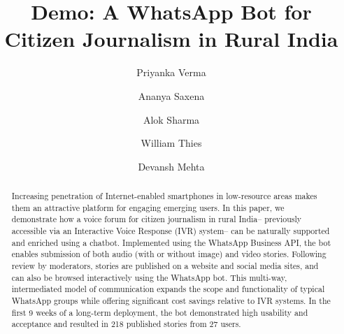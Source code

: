 \documentclass[manuscript]{acmart}
\begin{document}
\title{Demo: A WhatsApp Bot for Citizen Journalism in Rural India}



\author{Priyanka Verma}

\author{Ananya Saxena}
\author{Alok Sharma}
\author{William Thies}
\author{Devansh Mehta}



%

%
\begin{abstract}
Increasing penetration of Internet-enabled smartphones in low-resource areas makes them an attractive platform for engaging emerging users. In this paper, we demonstrate how a voice forum for citizen journalism in rural India-- previously accessible via an Interactive Voice Response (IVR) system-- can be naturally supported and enriched using a chatbot. Implemented using the WhatsApp Business API, the bot enables submission of both audio (with or without image) and video stories. Following review by moderators, stories are published on a website and social media sites, and can also be browsed interactively using the WhatsApp bot. This multi-way, intermediated model of communication expands the scope and functionality of typical WhatsApp groups while offering significant cost savings relative to IVR systems. In the first 9 weeks of a long-term deployment, the bot demonstrated high usability and acceptance and resulted in 218 published stories from 27 users.
\end{abstract}
\end{document}

